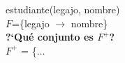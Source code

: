 \documentclass[preview]{standalone}
\begin{document}
estudiante(legajo, nombre)\\
$F$=\{legajo $\rightarrow$ nombre\}\\

\textbf{?`Qu\'e conjunto es $F^+$?}\\

$F^+$ = \big\{$\dots$
\end{document}
